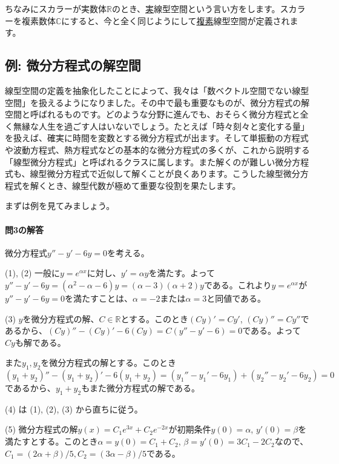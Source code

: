 ちなみにスカラーが実数体$\mathbb{R}$のとき、\uline{実}線型空間という言い方をします。スカラーを複素数体$\mathbb{C}$にすると、今と全く同じようにして\uline{複素}線型空間が定義されます。

\subsection{例: 微分方程式の解空間}

線型空間の定義を抽象化したことによって、我々は「数ベクトル空間でない線型空間」を扱えるようになりました。その中で最も重要なものが、微分方程式の解空間と呼ばれるものです。どのような分野に進んでも、おそらく微分方程式と全く無縁な人生を過ごす人はいないでしょう。たとえば「時々刻々と変化する量」を扱えば、確実に時間を変数とする微分方程式が出ます。そして単振動の方程式や波動方程式、熱方程式などの基本的な微分方程式の多くが、これから説明する「線型微分方程式」と呼ばれるクラスに属します。また解くのが難しい微分方程式も、線型微分方程式で近似して解くことが良くあります。こうした線型微分方程式を解くとき、線型代数が極めて重要な役割を果たします。

まずは例を見てみましょう。

\paragraph{問3の解答} 微分方程式$y'' - y' - 6y = 0$を考える。

\noindent (1), (2) 一般に$y = e^{\alpha x}$に対し、$y' = \alpha y$を満たす。よって$y'' - y' - 6y = (\alpha^2 - \alpha - 6) y = (\alpha - 3)(\alpha + 2) y$である。これより$y = e^{\alpha x}$が$y'' - y' - 6y =0$を満たすことは、$\alpha = -2$または$\alpha = 3$と同値である。

\noindent (3) $y$を微分方程式の解、$C\in \mathbb{R}$とする。このとき$(Cy)' = Cy'$, $(Cy)'' = Cy''$であるから、$(Cy)'' - (Cy)' - 6(Cy) = C(y'' - y' - 6) = 0$である。よって$Cy$も解である。

また$y_1, y_2$を微分方程式の解とする。このとき$(y_1 + y_2)'' - (y_1 + y_2)' - 6(y_1 + y_2) = (y_1'' - y_1' - 6 y_1) + (y_2'' - y_2' - 6 y_2) = 0$であるから、$y_1 + y_2$もまた微分方程式の解である。

\noindent (4) は (1), (2), (3) から直ちに従う。

\noindent (5) 微分方程式の解$y(x) = C_1 e^{3x} + C_2 e^{-2x}$が初期条件$y(0) = \alpha$, $y'(0) = \beta$を満たすとする。このとき$\alpha = y(0) = C_1 + C_2$, $\beta = y'(0) = 3C_1 - 2C_2$なので、$C_1 = (2\alpha + \beta)/5, C_2 = (3\alpha - \beta)/5$である。

